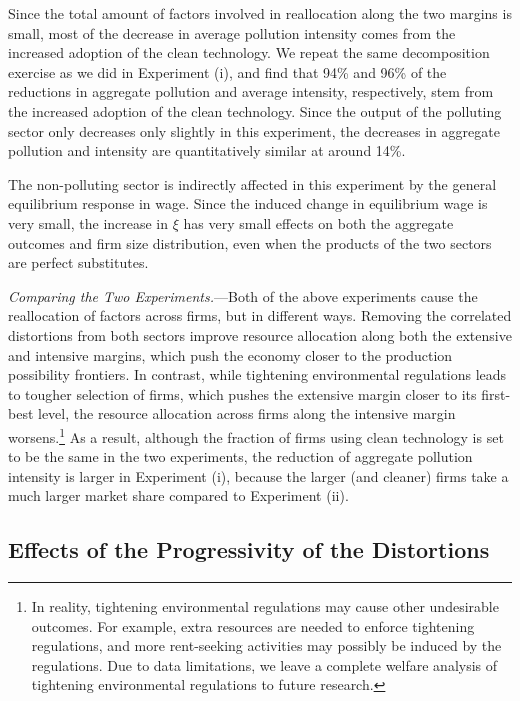 \documentclass[AEJ]{AEA}
\begin{document}
Since the total amount of factors involved in reallocation along the two margins is small, most of the decrease in average pollution intensity comes from the increased adoption of the clean technology. We repeat the same decomposition exercise as we did in Experiment (i), and find that 94\% and 96\% of the reductions in aggregate pollution and average intensity, respectively, stem from the increased adoption of the clean technology. Since the output of the polluting sector only decreases only slightly in this experiment, the decreases in aggregate pollution and intensity are quantitatively similar at around 14\%.

The non-polluting sector is indirectly affected in this experiment by the general equilibrium response in wage. Since the induced change in equilibrium wage is very small, the increase in $\xi$ has very small effects on both the aggregate outcomes and firm size distribution, even when the products of the two sectors are perfect substitutes.

\textit{Comparing the Two Experiments.}---Both of the above experiments cause the reallocation of factors across firms, but in different ways. Removing the correlated distortions from both sectors improve resource allocation along both the extensive and intensive margins, which push the economy closer to the production possibility frontiers. In contrast, while tightening environmental regulations leads to tougher selection of firms, which pushes the extensive margin closer to its first-best level, the resource allocation across firms along the intensive margin worsens.\footnote{In reality, tightening environmental regulations may cause other undesirable outcomes. For example, extra resources are needed to enforce tightening regulations, and more rent-seeking activities may possibly be induced by the regulations. Due to data limitations, we leave a complete welfare analysis of tightening environmental regulations to future research.} As a result, although the fraction of firms using clean technology is set to be the same in the two experiments, the reduction of aggregate pollution intensity is larger in Experiment (i), because the larger (and cleaner) firms take a much larger market share compared to Experiment (ii).

\subsection{Effects of the Progressivity of the Distortions}
\label{sec:progressivity}
\end{document}
